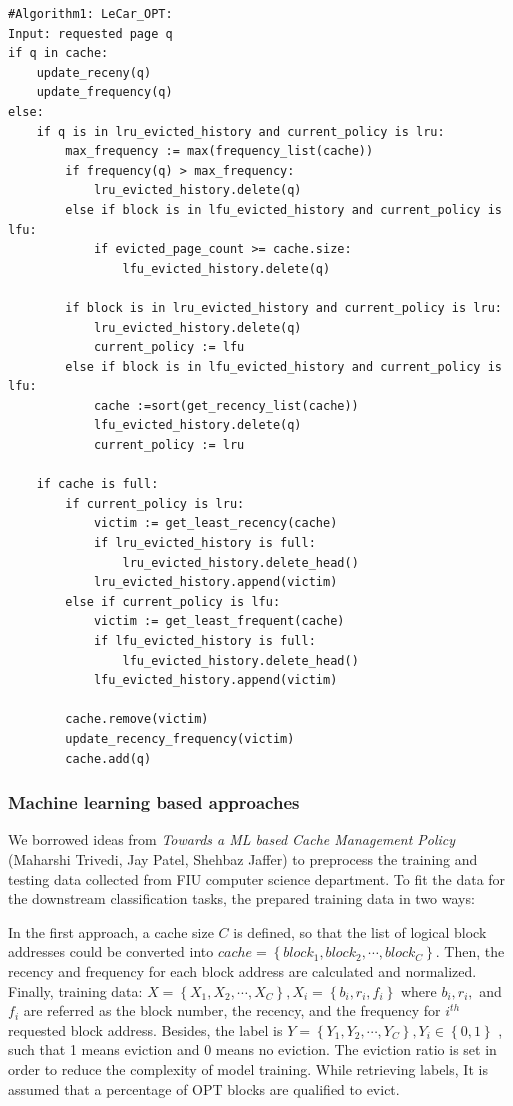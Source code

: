 \documentclass[letterpaper,twocolumn,10pt]{article}
\begin{document}
\begin{lstlisting}
#Algorithm1: LeCar_OPT:
Input: requested page q
if q in cache:
    update_receny(q)
    update_frequency(q)
else:
    if q is in lru_evicted_history and current_policy is lru:
        max_frequency := max(frequency_list(cache))
        if frequency(q) > max_frequency:
            lru_evicted_history.delete(q)
        else if block is in lfu_evicted_history and current_policy is lfu:
            if evicted_page_count >= cache.size:
                lfu_evicted_history.delete(q)

        if block is in lru_evicted_history and current_policy is lru:
            lru_evicted_history.delete(q)
            current_policy := lfu
        else if block is in lfu_evicted_history and current_policy is lfu:
            cache :=sort(get_recency_list(cache))
            lfu_evicted_history.delete(q)
            current_policy := lru
                
    if cache is full:
        if current_policy is lru:
            victim := get_least_recency(cache)
            if lru_evicted_history is full:
                lru_evicted_history.delete_head()
            lru_evicted_history.append(victim)
        else if current_policy is lfu:
            victim := get_least_frequent(cache)
            if lfu_evicted_history is full:
                lfu_evicted_history.delete_head()
            lfu_evicted_history.append(victim) 

        cache.remove(victim)
        update_recency_frequency(victim)
        cache.add(q)

\end{lstlisting}


\subsubsection{Machine learning based approaches}
We borrowed ideas from \textit{Towards a ML based Cache Management Policy} (Maharshi Trivedi, Jay Patel, Shehbaz Jaffer) to preprocess the training and testing data collected from FIU computer science department. To fit the data for the downstream classification tasks, the prepared training data in two ways:

In the first approach, a cache size $C$ is defined, so that the list of logical block addresses could be converted into $cache = \left \{ block_1, block_2,\cdots , block_C \right \}$. Then, the recency and frequency for each block address are calculated and normalized. Finally, training data: $X = \left \{ X_1, X_2, \cdots, X_C \right \}, X_i = \left \{ b_i, r_i, f_i \right \}$ where $b_i, r_i,$ and $f_i$ are referred as the block number, the recency, and the frequency for $i^{th}$ requested block address. Besides, the label is $Y = \left \{Y_1, Y_2, \cdots, Y_C\right\}, Y_i \in \left \{ 0,1 \right \}$ , such that 1 means eviction and 0 means no eviction. The eviction ratio is set in order to reduce the complexity of model training. While retrieving labels, It is assumed that a percentage of OPT blocks are qualified to evict.
\end{document}
